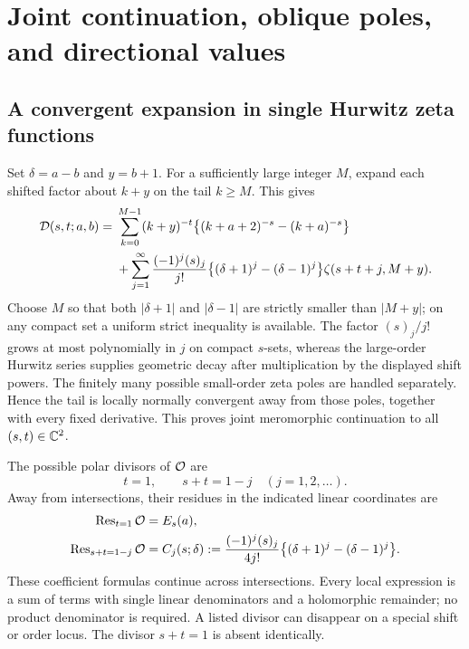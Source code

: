 \section{Joint continuation, oblique poles, and directional values}
\label{sec:continuation}

\subsection{A convergent expansion in single Hurwitz zeta functions}

Set $\delta=a-b$ and $y=b+1$. For a sufficiently large integer $M$,
expand each shifted factor about $k+y$ on the tail $k\ge M$.
This gives
\begin{align}\label{eq:hurwitz-expansion}
 \mathcal D(s,t;a,b)={}&
 \sum_{k=0}^{M-1}(k+y)^{-t}
       \bigl\{(k+a+2)^{-s}-(k+a)^{-s}\bigr\}\notag\\
 &+\sum_{j=1}^{\infty}\frac{(-1)^j(s)_j}{j!}
      \bigl\{(\delta+1)^j-(\delta-1)^j\bigr\}
           \zeta(s+t+j,M+y).
\end{align}
Choose $M$ so that both $|\delta+1|$ and $|\delta-1|$ are
strictly smaller than $|M+y|$; on any compact set a uniform strict
inequality is available. The factor $(s)_j/j!$ grows at most
polynomially in $j$ on compact $s$-sets, whereas the large-order
Hurwitz series supplies geometric decay after multiplication by
the displayed shift powers. The finitely many possible small-order
zeta poles are handled separately. Hence the tail is locally normally
convergent away from those poles, together with every fixed derivative.
This proves joint meromorphic continuation to all $(s,t)\in\mathbb C^2$.

\begin{theorem}\label{thm:poles}
The possible polar divisors of $\mathcal O$ are
\begin{equation}\label{eq:polar-divisors}
 t=1,\qquad s+t=1-j\quad(j=1,2,\ldots).
\end{equation}
Away from intersections, their residues in the indicated linear
coordinates are
\begin{align}\label{eq:polar-coefficients}
 \operatorname{Res}_{t=1}\mathcal O&=E_s(a),\notag\\
 \operatorname{Res}_{s+t=1-j}\mathcal O&=
 C_j(s;\delta):=\frac{(-1)^j(s)_j}{4j!}
              \bigl\{(\delta+1)^j-(\delta-1)^j\bigr\}.
\end{align}
These coefficient formulas continue across intersections. Every local
expression is a sum of terms with single linear denominators and a
holomorphic remainder; no product denominator is required. A listed
divisor can disappear on a special shift or order locus. The divisor
$s+t=1$ is absent identically.
\end{theorem}

